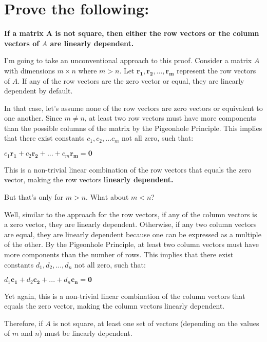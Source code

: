 \documentclass[
  letterpaper,
  DIV=11,
  numbers=noendperiod]{scrartcl}
\begin{document}
\newpage{}

\hypertarget{prove-the-following}{%
\section{Prove the following:}\label{prove-the-following}}

\textbf{If a matrix \(\symbf{A}\) is not square, then either the row
vectors or the column vectors of \(A\) are linearly dependent.}

I'm going to take an unconventional approach to this proof. Consider a
matrix \(A\) with dimensions \(m \times n\) where \(m > n\). Let
\(\symbf{r_1, r_2, ..., r_m}\) represent the row vectors of \(A\). If
any of the row vectors are the zero vector or equal, they are linearly
dependent by default.

In that case, let's assume none of the row vectors are zero vectors or
equivalent to one another. Since \(m \ne n\), at least two row vectors
must have more components than the possible columns of the matrix by the
Pigeonhole Principle. This implies that there exist constants
\(c_1, c_2, ... c_m\) not all zero, such that:

\(c_1\symbf{r_1}+c_2\symbf{r_2}+ ... + c_m\symbf{r_m} = \symbf{0}\)

This is a non-trivial linear combination of the row vectors that equals
the zero vector, making the row vectors \textbf{linearly dependent.}

But that's only for \(m > n\). What about \(m < n\)?

Well, similar to the approach for the row vectors, if any of the column
vectors is a zero vector, they are linearly dependent. Otherwise, if any
two column vectors are equal, they are linearly dependent because one
can be expressed as a multiple of the other. By the Pigeonhole
Principle, at least two column vectors must have more components than
the number of rows. This implies that there exist constants
\(d_1, d_2, ..., d_n\) not all zero, such that:

\(d_1\symbf{c_1}+d_2\symbf{c_2}+ ... +d_n\symbf{c_n} = \symbf{0}\)

Yet again, this is a non-trivial linear combination of the column
vectors that equals the zero vector, making the column vectors linearly
dependent.

Therefore, if \(A\) is not square, at least one set of vectors
(depending on the values of \(m\) and \(n\)) must be linearly dependent.

\newpage{}
\end{document}
